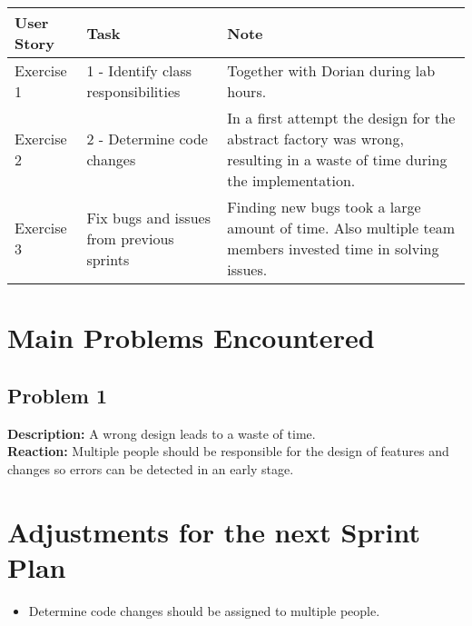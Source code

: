 \documentclass[10pt]{article}
\begin{document}
\begin{center}
        \hspace*{-3cm}\begin{tabular}{| p{2cm} | p{9cm} | p{7.8cm} |}
        \hline
        User Story & Task & Note \\ \hline
         Exercise 1 & 1 - Identify class responsibilities & Together with Dorian during lab hours.\\ \hline
         Exercise 2 & 2 - Determine code changes & In a first attempt the design for the abstract factory was wrong, resulting in a waste of time during the implementation. \\ \hline
         Exercise 3 & Fix bugs and issues from previous sprints & Finding new bugs took a large amount of time. Also multiple team members invested time in solving issues.\\ \hline
        \end{tabular}
\end{center}

\section*{Main Problems Encountered}
\subsection*{Problem 1}
\textbf{Description:}
A wrong design leads to a waste of time.\\
\textbf{Reaction:} 
Multiple people should be responsible for the design of features and changes so errors can be detected in an early stage.

\section*{Adjustments for the next Sprint Plan}
\begin{itemize}
\item Determine code changes should be assigned to multiple people.
\end{itemize}
\end{document}
